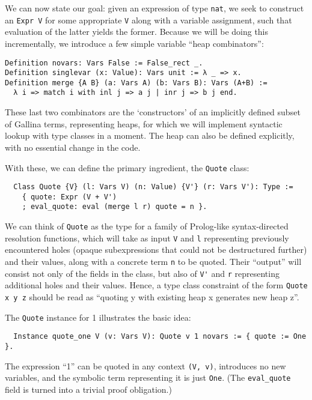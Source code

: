 \documentclass[a4paper,10pt,runningheads]{llncs}
\begin{document}

We can now state our goal: given an expression of type \lstinline|nat|, we seek to construct an \lstinline|Expr V| for some appropriate \lstinline|V| along with a variable assignment, such that evaluation of the latter yields the former. Because we will be doing this incrementally, we introduce a few simple variable ``heap combinators'':
\begin{lstlisting}
Definition novars: Vars False := False_rect _.
Definition singlevar (x: Value): Vars unit := λ _ => x.
Definition merge {A B} (a: Vars A) (b: Vars B): Vars (A+B) :=
  λ i => match i with inl j => a j | inr j => b j end.
\end{lstlisting}
These last two combinators are the `constructors' of an implicitly defined subset of Gallina terms, representing heaps, for which we will implement syntactic lookup with type classes in a moment. The heap can also be defined explicitly, with no essential change in the code.

With these, we can define the primary ingredient, the \lstinline|Quote| class:
\begin{lstlisting}
  Class Quote {V} (l: Vars V) (n: Value) {V'} (r: Vars V'): Type :=
    { quote: Expr (V + V')
    ; eval_quote: eval (merge l r) quote = n }.
\end{lstlisting}
We can think of \lstinline|Quote| as the type for a family of Prolog-like syntax-directed resolution functions, which will take as input \lstinline|V| and \lstinline|l| representing previously encountered holes (opaque subexpressions that could not be destructured further) and their values, along with a concrete term \lstinline|n| to be quoted. Their ``output'' will consist not only of the fields in the class, but also of \lstinline|V'| and \lstinline|r| representing additional holes and their values. Hence, a type class constraint of the form \lstinline|Quote x y z| should be read as ``quoting y with existing heap x generates new heap z''.

The \lstinline|Quote| instance for 1 illustrates the basic idea:
\begin{lstlisting}
  Instance quote_one V (v: Vars V): Quote v 1 novars := { quote := One }.
\end{lstlisting}
The expression ``1'' can be quoted in any context \lstinline|(V, v)|, introduces no new variables, and the symbolic term representing it is just \lstinline|One|. (The \lstinline|eval_quote| field is turned into a trivial proof obligation.)
\end{document}
